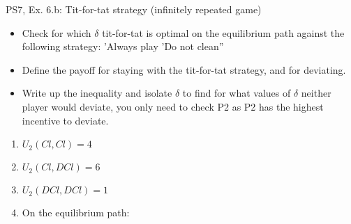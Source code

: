 \begin{frame}{PS7, Ex. 6.b: Tit-for-tat strategy (infinitely repeated game)}
    \begin{itemize}
    \item[(b)] Check for which $\delta$ tit-for-tat is optimal on the equilibrium path against the following strategy: ’Always play ’Do not clean”
    \end{itemize}
  \begin{multicols}{2}
  \begin{itemize}
      \item[(Step a)] Define the payoff for staying with the tit-for-tat strategy, and for deviating.
      \item[(Step b)] Write up the inequality and isolate $\delta$ to find for what values of $\delta$ neither player would deviate, you only need to check P2 as P2 has the highest incentive to deviate.
  \end{itemize}
    \vfill\null\columnbreak
    \begin{enumerate}
        \item $U_2(Cl,Cl) = 4$
        \item $U_2(Cl,DCl) = 6$
        \item $U_2(DCl,DCl) = 1$
        \item On the equilibrium path:
    \end{enumerate}
    \vfill\null
  \end{multicols}
\end{frame}

